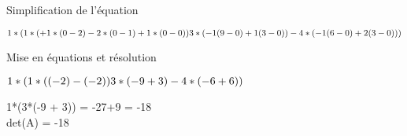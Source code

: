 \vspace{4mm} %
Simplification de l'équation
\vspace{5mm} %

$
1*(\\
  1*(+1*(0 - 2)-2*(0 - 1)+1*(0 - 0))\\
  3*(-1(9 - 0)+1(3 - 0))\\
  -4*(-1(6 - 0)+2(3 - 0))\\
  )
$


\vspace{4mm} %
Mise en équations et résolution
\vspace{5mm} %

$
1*(\\
  1*((-2)-(-2)) \\
  3*(-9 + 3)\\
  -4*(-6 +6 )\\
  )\\
$

1*(3*(-9 + 3)) = -27+9 = -18\\

det(A) = -18\\
